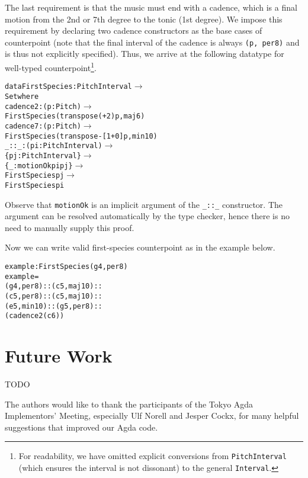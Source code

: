 \documentclass[sigplan,10pt,screen]{acmart}
\begin{document}
The last requirement is that the music must end with a cadence,
which is a final motion from the 2nd or 7th degree to the tonic 
(1st degree). 
We impose this requirement by declaring two cadence constructors 
as the base cases of counterpoint (note that the final interval of
the cadence is always \texttt{(p, per8)} and is thus not explicitly
specified).
Thus, we arrive at the following datatype for well-typed counterpoint\footnote{
For readability, we have omitted explicit conversions 
from \texttt{PitchInterval} (which ensures the interval is not dissonant) 
to the general \texttt{Interval}.}.

\begin{alltt}
data FirstSpecies : PitchInterval \(\rightarrow\)
                    Set where
  cadence2 : (p : Pitch) \(\rightarrow\)
    FirstSpecies (transpose (+ 2) p , maj6)
  cadence7 : (p : Pitch) \(\rightarrow\)
    FirstSpecies (transpose -[1+ 0 ] p , min10)
  \_::\_ : (pi : PitchInterval) \(\rightarrow\)
         \{pj : PitchInterval\} \(\rightarrow\)
         \{\_ : motionOk pi pj\} \(\rightarrow\)
         FirstSpecies pj \(\rightarrow\)
         FirstSpecies pi
\end{alltt}

\noindent Observe that \texttt{motionOk} is an implicit argument of 
the \texttt{\_::\_} constructor. 
The argument can be resolved automatically by the type checker,
hence there is no need to manually supply this proof. 

Now we can write valid first-species counterpoint as in the 
example below.

\begin{alltt}
example : FirstSpecies (g 4 , per8)
example = 
  (g 4 , per8) :: (c 5 , maj10) ::
  (c 5 , per8) :: (c 5 , maj10) ::
  (e 5 , min10) :: (g 5 , per8) ::
  (cadence2 (c 6))
\end{alltt}


\section{Future Work}

TODO


\begin{acks}                            %
 The authors would like to thank the participants of the Tokyo Agda 
 Implementors' Meeting, especially Ulf Norell and Jesper Cockx,
 for many helpful suggestions that improved our Agda code.
\end{acks}



\end{document}
